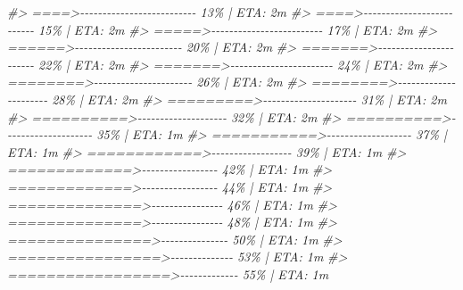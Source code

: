 \documentclass[
]{book}
\newenvironment{Shaded}{\begin{snugshade}}{\end{snugshade}}
\newcommand{\CommentTok}[1]{\textcolor[rgb]{0.56,0.35,0.01}{\textit{#1}}}
\begin{document}
\begin{Shaded}
\begin{Highlighting}[]
\CommentTok{\#\textgreater{}  ====\textgreater{}{-}{-}{-}{-}{-}{-}{-}{-}{-}{-}{-}{-}{-}{-}{-}{-}{-}{-}{-}{-}{-}{-}{-}{-}{-}{-}   13\% |  ETA:  2m}
\CommentTok{\#\textgreater{}  ====\textgreater{}{-}{-}{-}{-}{-}{-}{-}{-}{-}{-}{-}{-}{-}{-}{-}{-}{-}{-}{-}{-}{-}{-}{-}{-}{-}{-}   15\% |  ETA:  2m}
\CommentTok{\#\textgreater{}  =====\textgreater{}{-}{-}{-}{-}{-}{-}{-}{-}{-}{-}{-}{-}{-}{-}{-}{-}{-}{-}{-}{-}{-}{-}{-}{-}{-}   17\% |  ETA:  2m}
\CommentTok{\#\textgreater{}  ======\textgreater{}{-}{-}{-}{-}{-}{-}{-}{-}{-}{-}{-}{-}{-}{-}{-}{-}{-}{-}{-}{-}{-}{-}{-}{-}   20\% |  ETA:  2m}
\CommentTok{\#\textgreater{}  =======\textgreater{}{-}{-}{-}{-}{-}{-}{-}{-}{-}{-}{-}{-}{-}{-}{-}{-}{-}{-}{-}{-}{-}{-}{-}   22\% |  ETA:  2m}
\CommentTok{\#\textgreater{}  =======\textgreater{}{-}{-}{-}{-}{-}{-}{-}{-}{-}{-}{-}{-}{-}{-}{-}{-}{-}{-}{-}{-}{-}{-}{-}   24\% |  ETA:  2m}
\CommentTok{\#\textgreater{}  ========\textgreater{}{-}{-}{-}{-}{-}{-}{-}{-}{-}{-}{-}{-}{-}{-}{-}{-}{-}{-}{-}{-}{-}{-}   26\% |  ETA:  2m}
\CommentTok{\#\textgreater{}  ========\textgreater{}{-}{-}{-}{-}{-}{-}{-}{-}{-}{-}{-}{-}{-}{-}{-}{-}{-}{-}{-}{-}{-}{-}   28\% |  ETA:  2m}
\CommentTok{\#\textgreater{}  =========\textgreater{}{-}{-}{-}{-}{-}{-}{-}{-}{-}{-}{-}{-}{-}{-}{-}{-}{-}{-}{-}{-}{-}   31\% |  ETA:  2m}
\CommentTok{\#\textgreater{}  ==========\textgreater{}{-}{-}{-}{-}{-}{-}{-}{-}{-}{-}{-}{-}{-}{-}{-}{-}{-}{-}{-}{-}   32\% |  ETA:  2m}
\CommentTok{\#\textgreater{}  ==========\textgreater{}{-}{-}{-}{-}{-}{-}{-}{-}{-}{-}{-}{-}{-}{-}{-}{-}{-}{-}{-}{-}   35\% |  ETA:  1m}
\CommentTok{\#\textgreater{}  ===========\textgreater{}{-}{-}{-}{-}{-}{-}{-}{-}{-}{-}{-}{-}{-}{-}{-}{-}{-}{-}{-}   37\% |  ETA:  1m}
\CommentTok{\#\textgreater{}  ============\textgreater{}{-}{-}{-}{-}{-}{-}{-}{-}{-}{-}{-}{-}{-}{-}{-}{-}{-}{-}   39\% |  ETA:  1m}
\CommentTok{\#\textgreater{}  =============\textgreater{}{-}{-}{-}{-}{-}{-}{-}{-}{-}{-}{-}{-}{-}{-}{-}{-}{-}   42\% |  ETA:  1m}
\CommentTok{\#\textgreater{}  =============\textgreater{}{-}{-}{-}{-}{-}{-}{-}{-}{-}{-}{-}{-}{-}{-}{-}{-}{-}   44\% |  ETA:  1m}
\CommentTok{\#\textgreater{}  ==============\textgreater{}{-}{-}{-}{-}{-}{-}{-}{-}{-}{-}{-}{-}{-}{-}{-}{-}   46\% |  ETA:  1m}
\CommentTok{\#\textgreater{}  ==============\textgreater{}{-}{-}{-}{-}{-}{-}{-}{-}{-}{-}{-}{-}{-}{-}{-}{-}   48\% |  ETA:  1m}
\CommentTok{\#\textgreater{}  ===============\textgreater{}{-}{-}{-}{-}{-}{-}{-}{-}{-}{-}{-}{-}{-}{-}{-}   50\% |  ETA:  1m}
\CommentTok{\#\textgreater{}  ================\textgreater{}{-}{-}{-}{-}{-}{-}{-}{-}{-}{-}{-}{-}{-}{-}   53\% |  ETA:  1m}
\CommentTok{\#\textgreater{}  =================\textgreater{}{-}{-}{-}{-}{-}{-}{-}{-}{-}{-}{-}{-}{-}   55\% |  ETA:  1m}

\end{Highlighting}
\end{Shaded}
\end{document}
